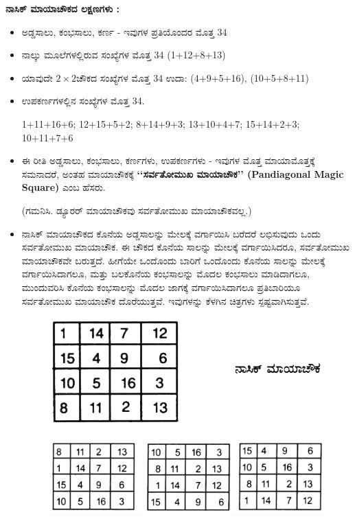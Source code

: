 \textbf{ನಾಸಿಕ್ ಮಾಯಾಚೌಕದ ಲಕ್ಷಣಗಳು :}

\begin{itemize}
	\item ಅಡ್ಡಸಾಲು, ಕಂಭಸಾಲು, ಕರ್ಣ - ಇವುಗಳ ಪ್ರತಿಯೊಂದರ ಮೊತ್ತ 34
	\item ನಾಲ್ಕು ಮೂಲೆಗಳಲ್ಲಿರುವ ಸಂಖ್ಯೆಗಳ ಮೊತ್ತ 34 (1+12+8+13)
	\item ಯಾವುದೇ $2 \times 2$ಚೌಕದ ಸಂಖ್ಯೆಗಳ ಮೊತ್ತ 34 ಉದಾ: (4+9+5+16), (10+5+8+11)
	\item ಉಪಕರ್ಣಗಳಲ್ಲಿನ ಸಂಖ್ಯೆಗಳ ಮೊತ್ತ 34.

	1+11+16+6; 12+15+5+2; 8+14+9+3; 13+10+4+7; 15+14+2+3; 10+11+7+6
	\item ಈ ರೀತಿ ಅಡ್ಡಸಾಲು, ಕಂಭಸಾಲು, ಕರ್ಣಗಳು, ಉಪಕರ್ಣಗಳು - ಇವುಗಳ ಮೊತ್ತ ಮಾಯಾಮೊತ್ತಕ್ಕೆ ಸಮನಾದರೆ, ಅಂತಹ ಮಾಯಾಚೌಕಕ್ಕೆ  \textbf{‘‘ಸರ್ವತೋಮುಖ ಮಾಯಾಚೌಕ’’ (Pandiagonal Magic Square)} ಎಂಬ ಹೆಸರು.

	(ಗಮನಿಸಿ. ಡ್ಯೂರರ್ ಮಾಯಾಚೌಕವು ಸರ್ವತೋಮುಖ ಮಾಯಾಚೌಕವಲ್ಲ.)
	\item ನಾಸಿಕ್ ಮಾಯಾಚೌಕದ ಕೊನೆಯ ಅಡ್ಡಸಾಲನ್ನು ಮೇಲಕ್ಕೆ ವರ್ಗಾಯಿಸಿ ಬರೆದರೆ ಲಭಿಸುವುದು ಒಂದು ಸರ್ವತೋಮುಖ ಮಾಯಾಚೌಕ. ಈ ಚೌಕದ ಕೊನೆಯ ಸಾಲನ್ನು ಮೇಲಕ್ಕೆ ವರ್ಗಾಯಿಸಿದರೂ, ಸರ್ವತೋಮುಖ ಮಾಯಾಚೌಕವೇ ಬರುತ್ತದೆ. ಹೀಗೆಯೇ ಒಂದೊಂದು ಬಾರಿಗೆ ಒಂದೊಂದು ಕೊನೆಯ ಸಾಲನ್ನು ಮೇಲಕ್ಕೆ ವರ್ಗಾಯಿಸಿದಾಗಲೂ, ಮತ್ತು ಬಲಕೊನೆಯ ಕಂಭಸಾಲನ್ನು ಮೊದಲ ಕಂಭಸಾಲು ಮಾಡಿದಾಗಲೂ, ಮುಂದುವರಿಸಿ ಕೊನೆಯ ಕಂಭಸಾಲನ್ನು ಮೊದಲ ಜಾಗಕ್ಕೆ ವರ್ಗಾಯಿಸಿದಾಗಲೂ ಪ್ರತಿಬಾರಿಯೂ ಸರ್ವತೋಮುಖ ಮಾಯಾಚೌಕ ದೊರೆಯುತ್ತವೆ. ಇವುಗಳನ್ನು ಕೆಳಗಿನ ಚಿತ್ರಗಳು ಸ್ಪಷ್ಟವಾಗಿಸುತ್ತವೆ.
	\begin{figure}[h]
	\includegraphics{src/figures/chap4/fig4.3.jpg}
	\end{figure}
	\begin{figure}[h]
	\includegraphics{src/figures/chap4/fig4.4.jpg}
	\end{figure}


\end{itemize}

